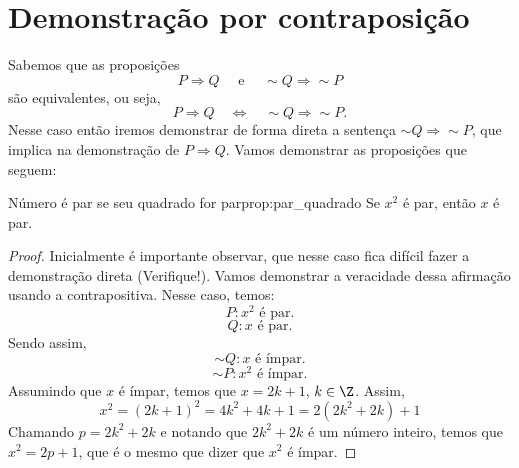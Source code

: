\section{Demonstração por contraposição}

Sabemos que as proposições
\[
  P \Rightarrow Q \quad\text{ e }\quad \sim Q \Rightarrow \sim P
\]
são equivalentes, ou seja,
\[
  P \Rightarrow Q \quad\Leftrightarrow\quad \sim Q \Rightarrow \sim P.
\]
Nesse caso então iremos demonstrar de forma direta a sentença
$\sim Q \Rightarrow \sim P$,
que implica na demonstração de $P \Rightarrow Q$. Vamos
demonstrar as proposições que seguem:

\begin{proposicao}{Número é par se seu quadrado for par}{prop:par_quadrado}
  Se $x^2$ é par, então $x$ é par.
\end{proposicao}

\begin{proof}
  Inicialmente é importante observar, que nesse caso fica difícil fazer a
  demonstração direta (Verifique!). Vamos demonstrar a veracidade dessa
  afirmação usando a contrapositiva. Nesse caso, temos:
  \[
    P\colon x^2 \text{ é par}.
  \]
  \[
    Q\colon x \text{ é par}.
  \]
  Sendo assim,
  \[
    \sim Q\colon x \text{ é ímpar}.
  \]
  \[
    \sim P\colon x^2 \text{ é ímpar}.
  \]
  Assumindo que $x$ é ímpar, temos que $x=2k+1$, $k \in \Z$. Assim,
  \[
    x^2
    = (2k+1)^2
    = 4k^2+4k+1
    = 2(2k^2+2k)+1
  \]
  Chamando $p=2k^2+2k$ e notando que $2k^2+2k$ é um número inteiro, temos que
  $x^2=2p+1$, que é o mesmo que dizer que $x^2$ é ímpar.
\end{proof}

